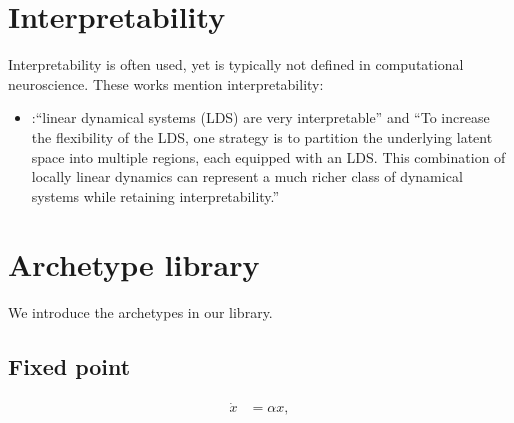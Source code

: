\documentclass{article}
\theoremstyle{definition} \newtheorem{definition}{Definition}  \newtheorem{example}{Example}
\theoremstyle{remark} \newtheorem{remark}{Remark}
\newcounter{ct}
\begin{document}
\newpage
\section{Interpretability}
Interpretability is often used, yet is typically not defined in computational neuroscience\citep{Zhao2016d, duncker2019learning}.
%
These works mention interpretability:
\begin{itemize}
\item \citet{Nassar2018b}:``linear dynamical systems (LDS) are very interpretable'' and  ``To increase the flexibility of the LDS, one strategy is to partition the underlying latent space into multiple regions, each equipped with an LDS. This combination of locally linear dynamics can represent a much richer class of dynamical systems while retaining interpretability.'' 
\end{itemize}


%






\newpage
\section{Archetype library}\label{sec:library}
We introduce the archetypes in our library.

\subsection{Fixed point}\label{sec:fp}
\[
\begin{aligned}
\dot{x} &= \alpha x, \\
\end{aligned}
\]
\end{document}
